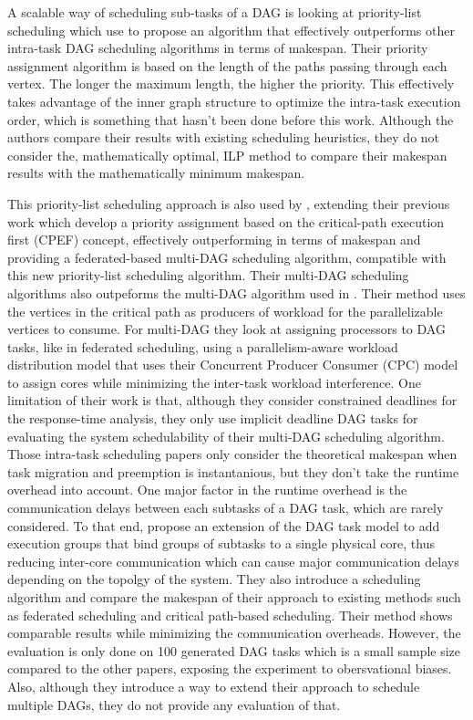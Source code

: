 A scalable way of scheduling sub-tasks of a DAG 
is looking at priority-list scheduling
which \citet{He2019DagIntra} use to propose 
an algorithm that effectively outperforms
other intra-task DAG scheduling algorithms
in terms of makespan.
Their priority assignment algorithm
is based on the length of the paths passing through each vertex.
The longer the maximum length, the higher the priority.
This effectively takes advantage of the inner graph structure
to optimize the intra-task execution order,
which is something that hasn't been done before this work.
Although the authors compare their results with existing
scheduling heuristics, they do not consider 
the, mathematically optimal, ILP method to compare
their makespan results with the mathematically minimum makespan.

This priority-list scheduling approach is also 
used by \cite{Zhao2022DAGsched}, extending their previous work\cite{zhao2020DAGsched}
which develop a priority assignment based on 
the critical-path execution first (CPEF) concept,
effectively outperforming \citet{He2019DagIntra}
in terms of makespan and providing 
a federated-based multi-DAG scheduling algorithm,
compatible with this new priority-list scheduling algorithm.
Their multi-DAG scheduling algorithms also outpeforms 
the multi-DAG algorithm used in \cite{He2019DagIntra}.
Their method uses the vertices in the critical path 
as producers of workload for the parallelizable vertices
to consume.
For multi-DAG they look at assigning processors
to DAG tasks, like in federated scheduling, using 
a parallelism-aware workload distribution model
that uses their Concurrent Producer Consumer (CPC) model
to assign cores while minimizing the inter-task workload interference.
One limitation of their work is that,
although they consider constrained deadlines for the response-time
analysis, they only use implicit deadline DAG tasks 
for evaluating the system schedulability of their multi-DAG 
scheduling algorithm.\\


Those intra-task scheduling papers only consider the theoretical
makespan when task migration and preemption 
is instantanious, but they don't take the runtime overhead into account.
One major factor in the runtime overhead is the communication 
delays between each subtasks of a DAG task, which are rarely considered.
To that end, \citet{Shi2024DagExecGroups}
propose an extension of the DAG task model to add 
execution groups that bind groups of subtasks
to a single physical core, thus reducing 
inter-core communication which can cause major
communication delays depending on the topolgy of the system.
They also introduce a scheduling algorithm 
and compare the makespan of their approach to existing methods
such as federated scheduling and critical path-based scheduling.
Their method shows comparable results while minimizing 
the communication overheads.
However, the evaluation is only done on 100 generated 
DAG tasks which is a small sample size compared to the other papers\cite{Zhao2022DAGsched}\cite{He2019DagIntra},
exposing the experiment to obersvational biases.
Also, although they introduce a way to extend their approach to schedule
multiple DAGs, they do not provide any evaluation of that.

